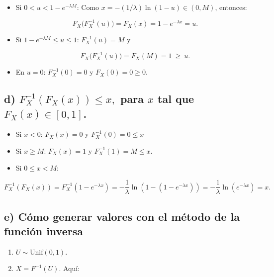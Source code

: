 \documentclass[10pt,a4paper]{article}
\providecommand{\tightlist}{%
      \setlength{\itemsep}{0pt}\setlength{\parskip}{0pt}}
\begin{document}
    \begin{itemize}
\item
  Si \(0<u<1-e^{-\lambda M}\): Como \(x=-(1/\lambda)\ln(1-u)\in(0,M)\),
  entonces:

  \[
  F_X\big(F_X^{-1}(u)\big)=F_X(x)=1-e^{-\lambda x}=u.
  \]
\item
  Si \(1-e^{-\lambda M}\le u\le1\): \(F_X^{-1}(u)=M\) y

  \[
  F_X\big(F_X^{-1}(u)\big)=F_X(M)=1\ \ge\ u.
  \]
\item
  En \(u=0\): \(F_X^{-1}(0)=0\) y \(F_X(0)=0\ge 0\).
\end{itemize}

    \hypertarget{d-f-1_xf_xx-leq-x-para-x-tal-que-f_xx-in-0-1.}{%
\subsection{\texorpdfstring{d) \(F^{-1}_X(F_X(x)) \leq x,\) para \(x\)
tal que
\(F_X(x) \in [0, 1]\).}{d) F\^{}\{-1\}\_X(F\_X(x)) \textbackslash leq x, para x tal que F\_X(x) \textbackslash in {[}0, 1{]}.}}\label{d-f-1_xf_xx-leq-x-para-x-tal-que-f_xx-in-0-1.}}

    \begin{itemize}
\item
  Si \(x<0\): \(F_X(x)=0\) y \(F_X^{-1}(0)=0\le x\)
\item
  Si \(x\ge M\): \(F_X(x)=1\) y \(F_X^{-1}(1)=M\le x\).
\item
  Si \(0\le x < M\):
\end{itemize}

\[
F_X^{-1}(F_X(x))=F_X^{-1}\left(1-e^{-\lambda x}\right)= -\dfrac{1}{\lambda}\ln(1-\left(1-e^{-\lambda x}\right))= -\dfrac{1}{\lambda}\ln(e^{-\lambda x})=x.
\]

    \hypertarget{e-cuxf3mo-generar-valores-con-el-muxe9todo-de-la-funciuxf3n-inversa}{%
\subsection{e) Cómo generar valores con el método de la función
inversa}\label{e-cuxf3mo-generar-valores-con-el-muxe9todo-de-la-funciuxf3n-inversa}}

    \begin{enumerate}
\def\labelenumi{\arabic{enumi}.}
\tightlist
\item
  \(U\sim\mathrm{Unif}(0,1)\).
\item
  \(X=F^{-1}(U)\). Aquí:
\end{enumerate}
\end{document}
